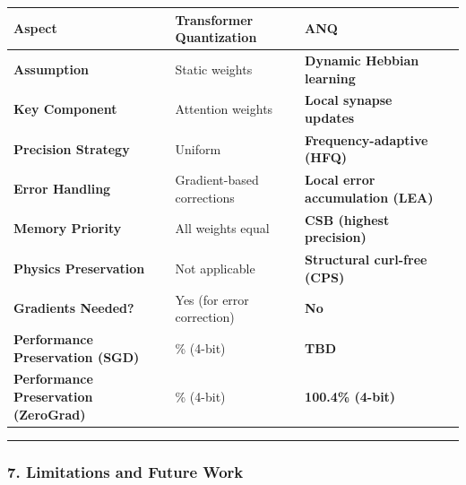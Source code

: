 \documentclass[
  11pt,
  a4paper,
]{article}
\begin{document}
\begin{longtable}[]{@{}
  >{\raggedright\arraybackslash}p{}
  >{\raggedright\arraybackslash}p{}
  >{\raggedright\arraybackslash}p{}
  >{\raggedright\arraybackslash}p{}@{}}
\toprule\noalign{}
\begin{minipage}[b]{\linewidth}\raggedright
Aspect
\end{minipage} & \begin{minipage}[b]{\linewidth}\raggedright
Transformer Quantization
\end{minipage} & \begin{minipage}[b]{\linewidth}\raggedright
\textbf{ANQ}
\end{minipage} & \begin{minipage}[b]{\linewidth}\raggedright
\end{minipage} \\
\midrule\noalign{}
\endhead
\bottomrule\noalign{}
\endlastfoot
\textbf{Assumption} & Static weights & \textbf{Dynamic Hebbian learning}
& \\
\textbf{Key Component} & Attention weights & \textbf{Local synapse
updates} & \\
\textbf{Precision Strategy} & Uniform & \textbf{Frequency-adaptive
(HFQ)} & \\
\textbf{Error Handling} & Gradient-based corrections & \textbf{Local
error accumulation (LEA)} & \\
\textbf{Memory Priority} & All weights equal & \textbf{CSB (highest
precision)} & \\
\textbf{Physics Preservation} & Not applicable & \textbf{Structural
curl-free (CPS)} & \\
\textbf{Gradients Needed?} & Yes (for error correction) & \textbf{No}
& \\
\textbf{Performance Preservation (SGD)} & 30\% (4-bit) & \textbf{TBD}
& \\
\textbf{Performance Preservation (ZeroGrad)} & 97.7\% (4-bit) &
\textbf{100.4\% (4-bit)} & \\
\end{longtable}

\begin{center}\rule{0.5\linewidth}{0.5pt}\end{center}

\subsubsection{7. Limitations and Future
Work}\label{limitations-and-future-work}
\end{document}
